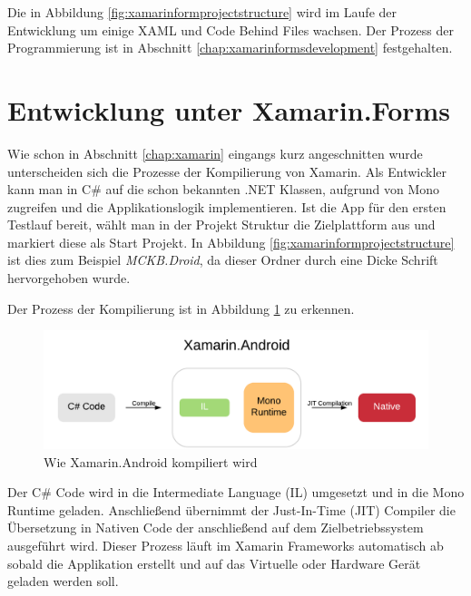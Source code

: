 	Die in Abbildung \ref{fig:xamarinformprojectstructure} wird im Laufe der Entwicklung um einige XAML und Code Behind Files wachsen. Der Prozess der Programmierung ist in Abschnitt \ref{chap:xamarinformsdevelopment} festgehalten.
	\newpage

\section{Entwicklung unter Xamarin.Forms}
\label{sec:xamarinformsdevelopement}

	Wie schon in Abschnitt \ref{chap:xamarin} eingangs kurz angeschnitten wurde unterscheiden sich die Prozesse der Kompilierung von Xamarin. Als Entwickler kann man in C\# auf die schon bekannten .NET Klassen, aufgrund von Mono zugreifen und die Applikationslogik implementieren. Ist die App für den ersten Testlauf bereit, wählt man in der Projekt Struktur die Zielplattform aus und markiert diese als Start Projekt. In Abbildung \ref{fig:xamarinformprojectstructure} ist dies zum Beispiel \textit{MCKB.Droid}, da dieser Ordner durch eine Dicke Schrift hervorgehoben wurde.

	Der Prozess der Kompilierung ist in Abbildung \ref{fig:xamarinanativeandroidcompile} zu erkennen.
	\begin{figure}[h!]
		\centering
		\includegraphics[width=1\textwidth]{images/Xamarin-Android.png}
		\caption{Wie Xamarin.Android kompiliert wird}
		\label{fig:xamarinanativeandroidcompile}
	\end{figure}

	Der C\# Code wird in die Intermediate Language (IL) umgesetzt und in die Mono Runtime geladen. Anschließend übernimmt der Just-In-Time (JIT) Compiler die Übersetzung in Nativen Code der anschließend auf dem Zielbetriebssystem ausgeführt wird. Dieser Prozess läuft im Xamarin Frameworks automatisch ab sobald die Applikation erstellt und auf das Virtuelle oder Hardware Gerät geladen werden soll.


